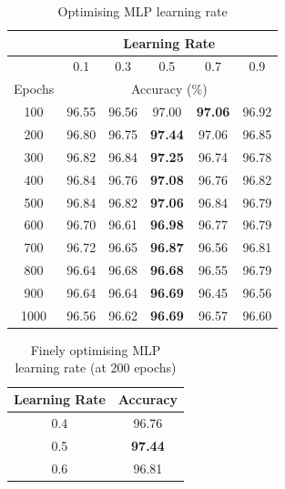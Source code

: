 \documentclass[12pt]{article}
\begin{document}
    \begin{table}[H]
      \centering
      \begin{tabular}{c|ccccc}
        \toprule
              & \multicolumn{5}{c}{Learning Rate} \\
        \midrule
              & \multicolumn{1}{c|}{0.1} & \multicolumn{1}{c|}{0.3} & \multicolumn{1}{c|}{0.5} & \multicolumn{1}{c|}{0.7} & \multicolumn{1}{c}{0.9} \\
        \midrule
        \multicolumn{1}{l|}{Epochs} & \multicolumn{5}{c}{Accuracy (\%)} \\
        \midrule
        100   & 96.55 & 96.56 & 97.00 & \textbf{97.06} & 96.92 \\
        200   & 96.80 & 96.75 & \textbf{97.44} & 97.06 & 96.85 \\
        300   & 96.82 & 96.84 & \textbf{97.25} & 96.74 & 96.78 \\
        400   & 96.84 & 96.76 & \textbf{97.08} & 96.76 & 96.82 \\
        500   & 96.84 & 96.82 & \textbf{97.06} & 96.84 & 96.79 \\
        600   & 96.70 & 96.61 & \textbf{96.98} & 96.77 & 96.79 \\
        700   & 96.72 & 96.65 & \textbf{96.87} & 96.56 & 96.81 \\
        800   & 96.64 & 96.68 & \textbf{96.68} & 96.55 & 96.79 \\
        900   & 96.64 & 96.64 & \textbf{96.69} & 96.45 & 96.56 \\
        1000  & 96.56 & 96.62 & \textbf{96.69} & 96.57 & 96.60 \\
        \bottomrule
      \end{tabular}%
      \caption{Optimising MLP learning rate}
      \label{tab:mlp-lr}%
    \end{table}%

    \begin{table}[H]
      \centering
      \begin{tabular}{c|c}
        \toprule
        Learning Rate & Accuracy \\
        \midrule
        0.4   & 96.76 \\
        0.5   & \textbf{97.44} \\
        0.6   & 96.81 \\
        \bottomrule
      \end{tabular}%
      \caption{Finely optimising MLP learning rate (at 200 epochs)}      \label{tab:mlp-lr-f}%
    \end{table}%
\end{document}
